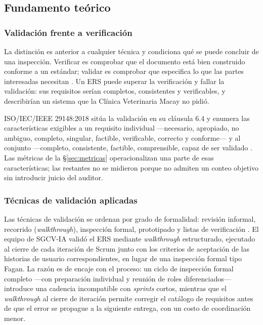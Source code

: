 \subsection{Fundamento teórico}
 
\subsubsection*{Validación frente a verificación}
 
La distinción es anterior a cualquier técnica y condiciona qué se puede concluir de una inspección.
Verificar es comprobar que el documento está bien construido conforme a un estándar; validar es
comprobar que especifica lo que las partes interesadas necesitan \cite{pohl2025}. Un ERS puede
superar la verificación y fallar la validación: sus requisitos serían completos, consistentes y
verificables, y describirían un sistema que la Clínica Veterinaria Macay no pidió.
 
ISO/IEC/IEEE 29148:2018 sitúa la validación en su cláusula 6.4 y enumera las características
exigibles a un requisito individual ---necesario, apropiado, no ambiguo, completo, singular,
factible, verificable, correcto y conforme--- y al conjunto ---completo, consistente, factible,
comprensible, capaz de ser validado \cite{iso29148}. Las métricas de la \S\ref{sec:metricas}
operacionalizan una parte de esas características; las restantes no se midieron porque no admiten un
conteo objetivo sin introducir juicio del auditor.
 
\subsubsection*{Técnicas de validación aplicadas}
 
Las técnicas de validación se ordenan por grado de formalidad: revisión informal, recorrido
(\emph{walkthrough}), inspección formal, prototipado y listas de verificación \cite{pohl2025,
swebok4}. El equipo de SGCV-IA validó el ERS mediante \emph{walkthrough} estructurado, ejecutado al
cierre de cada iteración de Scrum junto con los criterios de aceptación de las historias de usuario
correspondientes, en lugar de una inspección formal tipo Fagan. La razón es de encaje con el proceso:
un ciclo de inspección formal completo ---con preparación individual y reunión de roles
diferenciados--- introduce una cadencia incompatible con \emph{sprints} cortos, mientras que el
\emph{walkthrough} al cierre de iteración permite corregir el catálogo de requisitos antes de que el
error se propague a la siguiente entrega, con un costo de coordinación menor.
 
